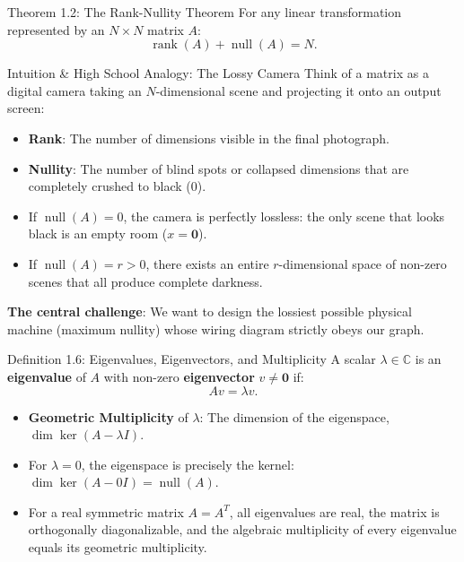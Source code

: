 \documentclass[11pt]{article}
\begin{document}
\begin{thmbox}{Theorem 1.2: The Rank-Nullity Theorem}
For any linear transformation represented by an $N \times N$ matrix $A$:
\begin{equation}
  \operatorname{rank}(A) + \operatorname{null}(A) = N.
\end{equation}
\end{thmbox}

\begin{intubox}{Intuition \& High School Analogy: The Lossy Camera}
Think of a matrix as a digital camera taking an $N$-dimensional scene and projecting it onto an output screen:
\begin{itemize}[leftmargin=*,nosep]
  \item \textbf{Rank}: The number of dimensions visible in the final photograph.
  \item \textbf{Nullity}: The number of blind spots or collapsed dimensions that are completely crushed to black ($0$).
  \item If $\operatorname{null}(A) = 0$, the camera is perfectly lossless: the only scene that looks black is an empty room ($x=\mathbf{0}$).
  \item If $\operatorname{null}(A) = r > 0$, there exists an entire $r$-dimensional space of non-zero scenes that all produce complete darkness.
\end{itemize}
\textbf{The central challenge}: We want to design the lossiest possible physical machine (maximum nullity) whose wiring diagram strictly obeys our graph.
\end{intubox}

\begin{defbox}{Definition 1.6: Eigenvalues, Eigenvectors, and Multiplicity}
A scalar $\lambda \in \mathbb{C}$ is an \textbf{eigenvalue} of $A$ with non-zero \textbf{eigenvector} $v \ne \mathbf{0}$ if:
\begin{equation}
  Av = \lambda v.
\end{equation}
\begin{itemize}[leftmargin=*,nosep]
  \item \textbf{Geometric Multiplicity} of $\lambda$: The dimension of the eigenspace, $\dim\ker(A - \lambda I)$.
  \item For $\lambda = 0$, the eigenspace is precisely the kernel: $\dim\ker(A - 0 I) = \operatorname{null}(A)$.
  \item For a real symmetric matrix $A = A^T$, all eigenvalues are real, the matrix is orthogonally diagonalizable, and the algebraic multiplicity of every eigenvalue equals its geometric multiplicity.
\end{itemize}
\end{defbox}
\end{document}

